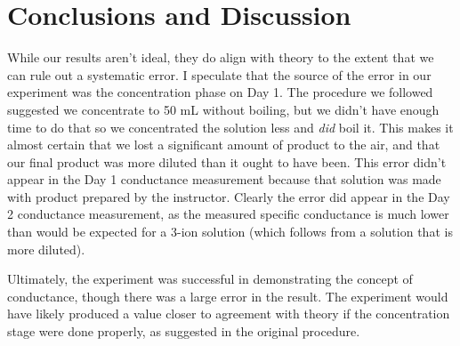 \documentclass{article}
\begin{document}
\section{Conclusions and Discussion}

While our results aren't ideal, they do align with theory to the extent that we can rule out a systematic error. I speculate that the source of the error in our experiment was the concentration phase on Day 1. The procedure we followed suggested we concentrate to 50 mL without boiling, but we didn't have enough time to do that so we concentrated the solution less and \textit{did} boil it. This makes it almost certain that we lost a significant amount of product to the air, and that our final product was more diluted than it ought to have been. This error didn't appear in the Day 1 conductance measurement because that solution was made with product prepared by the instructor. Clearly the error did appear in the Day 2 conductance measurement, as the measured specific conductance is much lower than would be expected for a 3-ion solution (which follows from a solution that is more diluted).

Ultimately, the experiment was successful in demonstrating the concept of conductance, though there was a large error in the result. The experiment would have likely produced a value closer to agreement with theory if the concentration stage were done properly, as suggested in the original procedure.
\end{document}
